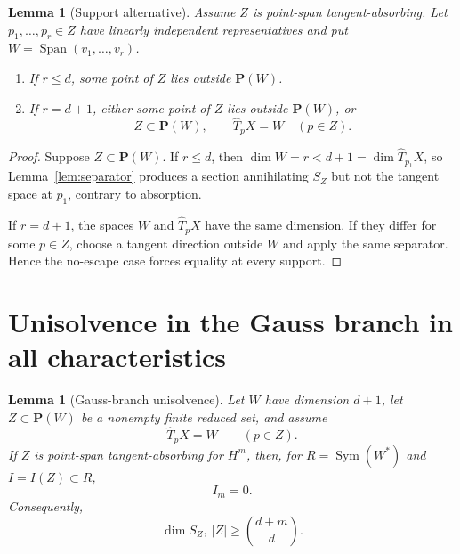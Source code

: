 \documentclass[11pt]{article}
\newtheorem{lemma}[theorem]{Lemma}
\newcommand{\PP}{\mathbf P}
\newcommand{\Span}{\operatorname{Span}}
\newcommand{\Sym}{\operatorname{Sym}}
\begin{document}
\begin{lemma}[Support alternative]\label{lem:support-alternative}
Assume $Z$ is point-span tangent-absorbing.  Let
$p_1,\ldots,p_r\in Z$ have linearly independent representatives and put
$W=\Span(v_1,\ldots,v_r)$.
\begin{enumerate}[label=(\roman*)]
\item If $r\leq d$, some point of $Z$ lies outside $\PP(W)$.
\item If $r=d+1$, either some point of $Z$ lies outside $\PP(W)$, or
\[
 Z\subset\PP(W),\qquad \widehat T_pX=W\quad(p\in Z).
\]
\end{enumerate}
\end{lemma}

\begin{proof}
Suppose $Z\subset\PP(W)$.  If $r\leq d$, then
$\dim W=r<d+1=\dim\widehat T_{p_1}X$, so
Lemma~\ref{lem:separator} produces a section annihilating $S_Z$ but not the
tangent space at $p_1$, contrary to absorption.

If $r=d+1$, the spaces $W$ and $\widehat T_pX$ have the same dimension.  If
they differ for some $p\in Z$, choose a tangent direction outside $W$ and
apply the same separator.  Hence the no-escape case forces equality at every
support.
\end{proof}

\section{Unisolvence in the Gauss branch in all characteristics}

\begin{lemma}[Gauss-branch unisolvence]\label{lem:gauss-unisolvence}
Let $W$ have dimension $d+1$, let $Z\subset\PP(W)$ be a nonempty finite
reduced set, and assume
\[
 \widehat T_pX=W\qquad(p\in Z).
\]
If $Z$ is point-span tangent-absorbing for $H^m$, then, for
$R=\Sym(W^*)$ and $I=I(Z)\subset R$,
\[
 I_m=0.
\]
Consequently,
\[
 \dim S_Z,\ |Z|\geq\binom{d+m}{d}.
\]
\end{lemma}
\end{document}
